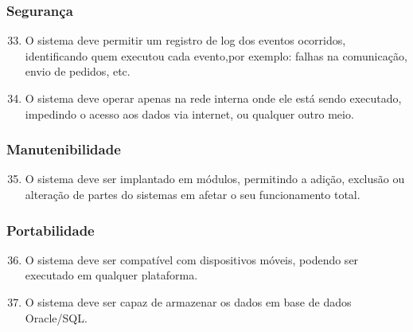 \documentclass[11pt,a4paper]{article}
\begin{document}
\subsubsection{Segurança}

\begin{enumerate}
\setcounter{enumi}{32}
    \item O sistema deve permitir um registro de log dos eventos ocorridos, identificando quem executou cada evento,por exemplo: falhas na comunicação, envio de pedidos, etc.
    \item O sistema deve operar apenas na rede interna onde ele está sendo executado, impedindo o acesso aos dados via internet, ou qualquer outro meio.
\end{enumerate}

\subsubsection{Manutenibilidade}

\begin{enumerate}
\setcounter{enumi}{34}
    \item O sistema deve ser implantado em módulos, permitindo a adição, exclusão ou alteração de partes do sistemas em afetar o seu funcionamento total.
\end{enumerate}

\subsubsection{Portabilidade}

\begin{enumerate}
\setcounter{enumi}{35}
    \item O sistema deve ser compatível com dispositivos móveis, podendo ser executado em qualquer plataforma.
    \item O sistema deve ser capaz de armazenar os dados em base de dados Oracle/SQL.
\end{enumerate}
\end{document}
